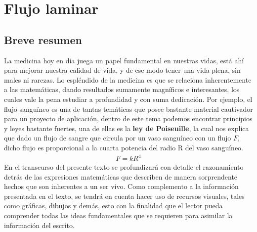\chapter{Flujo laminar}
\section{Breve resumen}
\onehalfspacing
La medicina hoy en día juega un papel fundamental en nuestras vidas, está ahí para mejorar nuestra calidad de vida, y de ese modo tener una vida plena, sin males ni rarezas.
Lo espléndido de la medicina es que se relaciona inherentemente a las matemáticas, dando resultados sumamente magníficos e interesantes, los cuales vale la pena estudiar a profundidad y con suma dedicación.
Por ejemplo, el flujo sanguíneo es una de tantas temáticas que posee bastante material cautivador para un proyecto de aplicación, dentro de este tema podemos encontrar principios y leyes bastante fuertes, una de ellas es la \textbf{ley de Poiseuille}, la cual nos explica que dado un flujo de sangre que circula por un vaso sanguíneo con un flujo $F$, dicho flujo es proporcional a la cuarta potencia del radio R del vaso sanguíneo. 
\begin{align}
    F=kR^{4} \label{first}
\end{align}
En el transcurso del presente texto se profundizará con detalle el razonamiento detrás de las expresiones matemáticas que describen de manera sorprendente hechos que  son inherentes a un ser vivo. Como complemento a la información presentada en el texto, se tendrá en cuenta hacer uso de recursos visuales, tales como gráficas, dibujos y demás, esto con la finalidad que el lector pueda comprender todas las ideas fundamentales que se requieren para asimilar la información del escrito.\\
